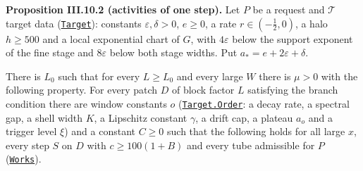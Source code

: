 \documentclass[
  letterpaper,
  11pt]{article}
\begin{document}
\textbf{Proposition III.10.2 (activities of one step).} Let \(P\) be a
request and \(\mathcal T\) target data
(\href{https://github.com/yang-mills-group/OpenAI-YM-20261028/blob/3456e5e75cf8d4cd558955a5c7638fba2d68f464/YM/AnalyticNext/CONNECTED_ACTIVITY_JETS_E6/OptionCost.lean\#L62-L76}{\texttt{Target}}):
constants \(\varepsilon,\delta>0\), \(e\ge0\), a rate
\(r\in(-\tfrac12,0)\), a halo \(h\ge500\) and a local exponential chart
of \(G\), with \(4\varepsilon\) below the support exponent of the fine
stage and \(8\varepsilon\) below both stage widths. Put
\(a_*=e+2\varepsilon+\delta\).

There is \(L_0\) such that for every \(L\ge L_0\) and every large \(W\)
there is \(\mu>0\) with the following property. For every patch \(D\) of
block factor \(L\) satisfying the branch condition there are window
constants \(o\)
(\href{https://github.com/yang-mills-group/OpenAI-YM-20261028/blob/3456e5e75cf8d4cd558955a5c7638fba2d68f464/YM/AnalyticNext/CONNECTED_ACTIVITY_JETS_E6/Issue.lean\#L33-L46}{\texttt{Target.Order}}:
a decay rate, a spectral gap, a shell width \(K\), a Lipschitz constant
\(\gamma\), a drift cap, a plateau \(a_o\) and a trigger level \(\xi\))
and a constant \(C\ge0\) such that the following holds for all large
\(x\), every step \(S\) on \(D\) with \(c\ge100(1+B)\) and every tube
admissible for \(P\)
(\href{https://github.com/yang-mills-group/OpenAI-YM-20261028/blob/3456e5e75cf8d4cd558955a5c7638fba2d68f464/YM/AnalyticNext/CONNECTED_ACTIVITY_JETS_E6/Room.lean\#L25-L28}{\texttt{Works}}).
\end{document}
